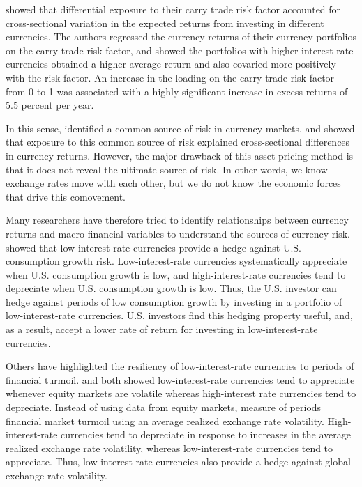 \documentclass{ar-1col}
\begin{document}
\citet{LustigRoussanovVerdelhan2011} showed that differential exposure to their carry trade risk factor accounted for cross-sectional variation in the expected returns from investing in different currencies. The authors regressed the currency returns of their currency portfolios on the carry trade risk factor, and showed the portfolios with higher-interest-rate currencies obtained a higher average return and also covaried more positively with the risk factor. An increase in the loading on the carry trade risk factor from 0 to 1 was associated with a highly significant increase in excess returns of 5.5 percent per year.

In this sense, \citet{LustigRoussanovVerdelhan2011} identified a common source of risk in currency markets, and showed that exposure to this common source of risk explained cross-sectional differences in currency returns. However, the major drawback of this asset pricing method is that it does not reveal the ultimate source of risk. In other words, we know exchange rates move with each other, but we do not know the economic forces that drive this comovement.

Many researchers have therefore tried to identify relationships between currency returns and macro-financial variables to understand the sources of currency risk. \citet{LustigVerdelhan2007} showed that low-interest-rate currencies provide a hedge against U.S. consumption growth risk. Low-interest-rate currencies systematically appreciate when U.S. consumption growth is low, and high-interest-rate currencies tend to depreciate when U.S. consumption growth is low. Thus, the U.S. investor can hedge against periods of low consumption growth by investing in a portfolio of low-interest-rate currencies. U.S. investors find this hedging property useful, and, as a result, accept a lower rate of return for investing in low-interest-rate currencies.

Others have highlighted the resiliency of low-interest-rate currencies to periods of financial turmoil. \citet{LustigRoussanovVerdelhan2011} and \citet{CampbellMedeirosViceira2010} both showed low-interest-rate currencies tend to appreciate whenever equity markets are volatile whereas high-interest rate currencies tend to depreciate. Instead of using data from equity markets, \citet{Menkhoffetal2012} measure of periods financial market turmoil using an average realized exchange rate volatility. High-interest-rate currencies tend to depreciate in response to increases in the average realized exchange rate volatility, whereas low-interest-rate currencies tend to appreciate. Thus, low-interest-rate currencies also provide a hedge against global exchange rate volatility. 
\end{document}
